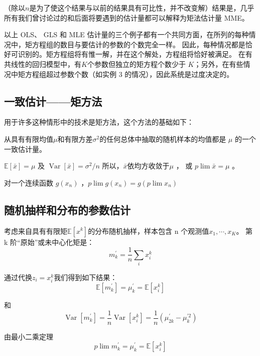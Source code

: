    （除以$ n $是为了使这个结果与以前的结果具有可比性，并不改变解）结果是，几乎所有我们曾讨论过的和后面将要遇到的估计量都可以解释为矩法估计量 MME。

   以上 OLS、 GLS 和 MLE 估计量的三个例子都有一个共同方面，在所列的每种情况中，矩方程组的数目与要估计的参数的个数完全一样。
   因此，每种情况都是恰好可识别的。矩方程组将有惟一解，并在这个解处，方程组将恰好被满足。
   在有共线性的回归模型中，有$ K $个参数但独立的矩方程个数少于 $ K $；另外，在有些情况中矩方程组超过参数个数（如实例 3 的情况），因此系统是过度决定的。
\subsection{一致估计——矩方法}

用于许多这种情形中的技术是矩方法，这个方法的基础如下：
\begin{theorem}[最小二乘定理]
    从具有有限均值$ \mu $和有限方差$ \sigma^{2} $的任何总体中抽取的随机样本的均值都是 $ \mu $ 的一个一致估计量。
    \begin{myproof}
        $ \mathbb{E}[\bar{x}]=\mu $  及  $ \operatorname{Var}[\bar{x}]=\sigma^{2} / n $ 所以，$ \bar{x} $依均方收敛于$ \mu $ ，
        或 $ p \lim \bar{x}=\mu $ 。
    \end{myproof}
\end{theorem}

\begin{theorem}
    对一个连续函数 $ g\left(x_{n}\right) $ ，$ p \lim g\left(x_{n}\right)=g\left(p \lim x_{n}\right) $ 
\end{theorem}

\subsection{随机抽样和分布的参数估计}

考虑来自具有有限矩$ \mathbb{E}\left[x^{k}\right] $的分布随机抽样，样本包含 n 个观测值$ x_{1}, \cdots, x_{K} $。
第 k 阶“原始”或未中心化矩是：
$$ m_{k}^{\prime}=\frac{1}{n} \sum_{i} x_{i}^{k} $$

通过代换$ z_{i}=x_{i}^{k} $我们得到如下结果：
$$ \mathbb{E}\left[m_{k}^{\prime}\right]=\mu_{k}^{\prime}=\mathbb{E}\left[x_{i}^{k}\right] $$

和
$$ \operatorname{Var}\left[m_{k}^{\prime}\right]=\frac{1}{n} 
      \operatorname{Var}\left[x_{i}^{k}\right]=\frac{1}{n}\left(\mu_{2 k}^{\prime}-\mu_{k}^{\prime 2}\right) $$

由最小二乘定理
$$ p \lim m_{k}^{\prime}=\mu_{k}^{\prime}=\mathbb{E}\left[x_{i}^{k}\right] $$


